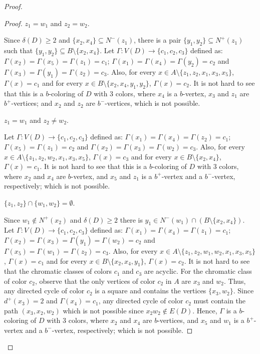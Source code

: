 \documentclass[10pt,a4paper]{amsart}
\begin{document}
\begin{proof}
\begin{proof}
 $z_1= w_1$ and $z_2 = w_2$.

\noindent Since $\delta(D) \geq 2$ and $\{x_2, x_4\}\subseteq N^-(z_1)$, there is a pair $\{y_1, y_2\}\subseteq N^+(z_1)$ such that $\{y_1, y_2\} \subseteq B\setminus\{x_2, x_4\}$. Let $\Gamma: V(D) \rightarrow \{c_1, c_2, c_3\}$ defined as: $\Gamma(x_2) =\Gamma(x_5) = \Gamma(z_1) = c_1$; $\Gamma(x_1)  = \Gamma(x_4)  = \Gamma(y_2) =  c_2$ and $\Gamma(x_3) = \Gamma(y_1) = \Gamma(z_2) = c_3$. Also, for every $x\in A\setminus\{z_1, z_2, x_1, x_3, x_5\}$, $\Gamma(x) = c_1$ and for every $x\in B\setminus\{x_2, x_4, y_1, y_2\}$, $\Gamma(x) = c_2$. It is not hard to see that this is a $b$-coloring of $D$ with 3 colors, where $x_4$ is a  $b$-vertex,  $x_3$ and $z_1$ are $b^+$-vertices; and $x_2$ and $z_2$ are $b^-$-vertices,  which is not possible. 

 $z_1= w_1$ and $z_2 \not=  w_2$.

\noindent  Let $\Gamma: V(D) \rightarrow \{c_1, c_2, c_3\}$ defined as: $\Gamma(x_1) = \Gamma(x_4) = \Gamma(z_2) = c_1$; $\Gamma(x_5)  = \Gamma(z_1) = c_2$ and $\Gamma(x_2) = \Gamma(x_3) = \Gamma(w_2) = c_3$. Also, for every $x\in A\setminus\{z_1, z_2, w_2, x_1, x_3, x_5\}$, $\Gamma(x) = c_3$ and for every $x\in B\setminus\{x_2, x_4\}$, $\Gamma(x) = c_1$. It is not hard to see that this is a $b$-coloring of $D$ with 3 colors, where $x_2$ and $x_4$ are  $b$-vertex, and $x_5$ and $z_1$ is a $b^+$-vertex and a $b^-$-vertex, respectively; which is not possible. 

  $\{z_1, z_2\}\cap \{w_1, w_2\} = \emptyset$.

\noindent  Since $w_1 \not \in N^+(x_2)$ and  $\delta(D) \geq 2$ there is $y_1\in N^-(w_1)\cap (B\setminus \{x_2, x_4\})$. 
Let $\Gamma: V(D) \rightarrow \{c_1, c_2, c_3\}$ defined as: $\Gamma(x_1) =\Gamma(x_4) = \Gamma(z_1) = c_1$; $\Gamma(x_2)  = \Gamma(x_3)  = \Gamma(y_1) =\Gamma(w_2) =  c_2$ and $\Gamma(x_5) = \Gamma(w_1) = \Gamma(z_2) = c_3$. Also, for every $x\in A\setminus\{z_1, z_2, w_1, w_2, x_1, x_3, x_5\}$, $\Gamma(x) = c_1$ and for every $x\in B\setminus\{x_2, x_4, y_1\}$, $\Gamma(x) = c_2$. It is not hard to see that the chromatic classes of colors $c_1$ and $c_3$ are acyclic. For the chromatic class of color $c_2$, observe that the only vertices of color $c_2$ in $A$ are $x_3$ and $w_2$. Thus, any directed cycle of color $c_2$ is a square and contains the vertices $\{x_3, w_2\}$. Since $d^+(x_3)= 2$ and $\Gamma (x_4)= c_1$, any directed cycle of color $c_2$ must contain the path $(x_3, x_2, w_2)$ which is not possible since $x_2w_2\not\in E(D)$. Hence, $\Gamma$ is a $b$-coloring of $D$ with 3 colors, where $x_2$ and $x_4$ are  $b$-vertices, and $x_5$ and $w_1$ is a $b^+$-vertex and a $b^-$-vertex, respectively; which is not possible.
\end{proof}


\end{proof}
\end{document}
